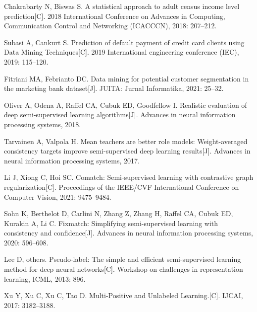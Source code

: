 \begin{thebibliography}{200}
	\wuhao %
	\linespread{1}\selectfont
	\setlength{\itemsep}{-1.4ex} %
	\thispagestyle{others}
	\pagestyle{others}
	
	\makeatletter
	\renewcommand\@biblabel[1]{[#1]\hfill} %
	\makeatother
	\setlength{\labelsep}{0cm}
	
	Chakrabarty N, Biswas S. A statistical approach to adult census income level prediction[C]. 2018 International Conference on Advances in Computing, Communication Control and Networking (ICACCCN), 2018: 207--212.
	
	Subasi A, Cankurt S. Prediction of default payment of credit card clients using Data Mining Techniques[C]. 2019 International engineering conference (IEC), 2019: 115--120.
	
	Fitriani MA, Febrianto DC. Data mining for potential customer segmentation in the marketing bank dataset[J]. JUITA: Jurnal Informatika, 2021: 25--32.
	
	Oliver A, Odena A, Raffel CA, Cubuk ED, Goodfellow I. Realistic evaluation of deep semi-supervised learning algorithms[J]. Advances in neural information processing systems, 2018.
	
	Tarvainen A, Valpola H. Mean teachers are better role models: Weight-averaged consistency targets improve semi-supervised deep learning results[J]. Advances in neural information processing systems, 2017.
	
	Li J, Xiong C, Hoi SC. Comatch: Semi-supervised learning with contrastive graph regularization[C]. Proceedings of the IEEE/CVF International Conference on Computer Vision, 2021: 9475--9484.
	
	Sohn K, Berthelot D, Carlini N, Zhang Z, Zhang H, Raffel CA, Cubuk ED, Kurakin A, Li C. Fixmatch: Simplifying semi-supervised learning with consistency and confidence[J]. Advances in neural information processing systems, 2020: 596--608.
	
	Lee D, others. Pseudo-label: The simple and efficient semi-supervised learning method for deep neural networks[C]. Workshop on challenges in representation learning, ICML, 2013: 896.
	
	Xu Y, Xu C, Xu C, Tao D. Multi-Positive and Unlabeled Learning.[C]. IJCAI, 2017: 3182--3188.
	

\end{thebibliography}
